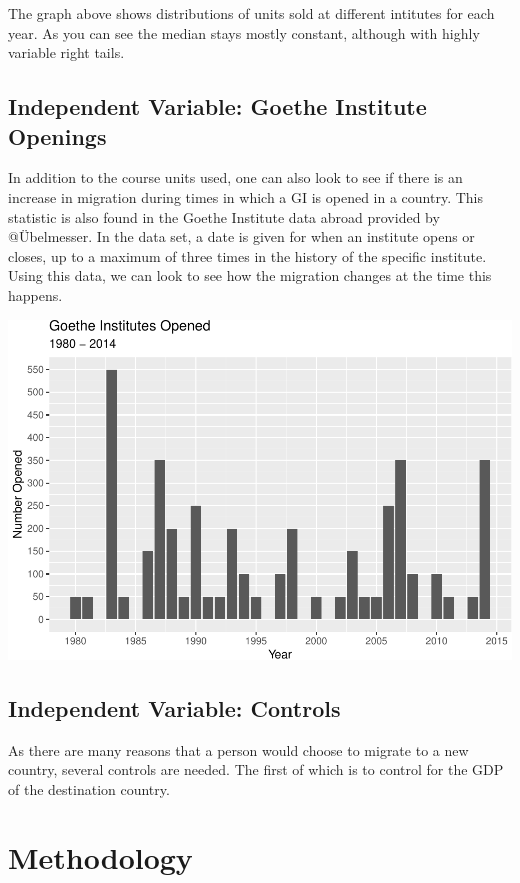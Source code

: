\documentclass[]{article}
\begin{document}
The graph above shows distributions of units sold at different intitutes
for each year. As you can see the median stays mostly constant, although
with highly variable right tails.

\subsection{Independent Variable: Goethe Institute
Openings}\label{independent-variable-goethe-institute-openings}

In addition to the course units used, one can also look to see if there
is an increase in migration during times in which a GI is opened in a
country. This statistic is also found in the Goethe Institute data
abroad provided by @Übelmesser. In the data set, a date is given for
when an institute opens or closes, up to a maximum of three times in the
history of the specific institute. Using this data, we can look to see
how the migration changes at the time this happens.

\includegraphics{Cultural_Exchange_and_Outbound_Migration_files/figure-latex/unnamed-chunk-2-1.pdf}

\subsection{Independent Variable:
Controls}\label{independent-variable-controls}

As there are many reasons that a person would choose to migrate to a new
country, several controls are needed. The first of which is to control
for the GDP of the destination country.

\section{Methodology}\label{methodology}
\end{document}
